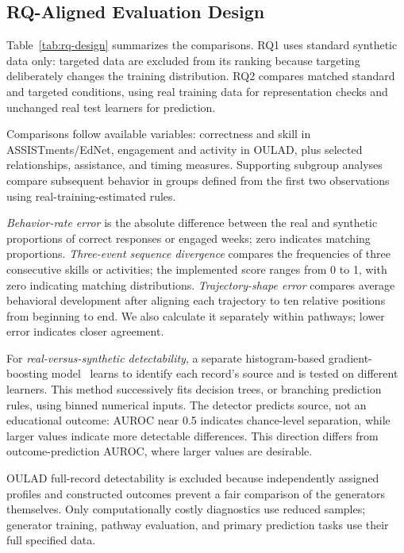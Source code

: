 \documentclass[fleqn,10pt]{JLA_article}
\begin{document}
\subsection{RQ-Aligned Evaluation Design}

Table~\ref{tab:rq-design} summarizes the comparisons. RQ1 uses standard synthetic data only: targeted data are excluded from its ranking because targeting deliberately changes the training distribution. RQ2 compares matched standard and targeted conditions, using real training data for representation checks and unchanged real test learners for prediction.

Comparisons follow available variables: correctness and skill in ASSISTments/EdNet, engagement and activity in OULAD, plus selected relationships, assistance, and timing measures. Supporting subgroup analyses compare subsequent behavior in groups defined from the first two observations using real-training-estimated rules.

\emph{Behavior-rate error} is the absolute difference between the real and synthetic proportions of correct responses or engaged weeks; zero indicates matching proportions. \emph{Three-event sequence divergence} compares the frequencies of three consecutive skills or activities; the implemented score ranges from 0 to 1, with zero indicating matching distributions. \emph{Trajectory-shape error} compares average behavioral development after aligning each trajectory to ten relative positions from beginning to end. We also calculate it separately within pathways; lower error indicates closer agreement.

For \emph{real-versus-synthetic detectability}, a separate histogram-based gradient-boosting model~\cite{friedman2001greedy} learns to identify each record's source and is tested on different learners. This method successively fits decision trees, or branching prediction rules, using binned numerical inputs. The detector predicts source, not an educational outcome: AUROC near 0.5 indicates chance-level separation, while larger values indicate more detectable differences. This direction differs from outcome-prediction AUROC, where larger values are desirable.

OULAD full-record detectability is excluded because independently assigned profiles and constructed outcomes prevent a fair comparison of the generators themselves. Only computationally costly diagnostics use reduced samples; generator training, pathway evaluation, and primary prediction tasks use their full specified data.
\end{document}
